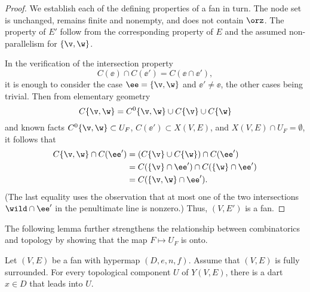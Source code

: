 \begin{proof} We establish each of the defining properties of a fan in
  turn.  The node set is unchanged,  remains finite and nonempty,
  and does not contain $\orz$.  The property  of
  $E'$ follow from the corresponding property of $E$ and the assumed
  non-parallelism for $\{\v,\w\}$.

In the verification of the intersection property
\begin{displaymath}
C(\ee)\cap C(\ee') = C(\ee \cap \ee'),
\end{displaymath}
it is enough to consider the case $\ee = \{\v,\w\}$ and $\ee' \ne
\ee$, the other cases being trivial.  Then from elementary geometry 
\begin{displaymath}
C\{\v,\w\} = C^0\{\v,\w\}\cup C\{\v\}\cup C\{\w\}
\end{displaymath}
and
known facts
$C^0\{\v,\w\}\subset U_F$, $C(\ee')\subset X(V,E)$, and $X(V,E)\cap
U_F=\emptyset$, it follows that
\begin{align*}
C\{\v,\w\} \cap C(\ee')  &= (C\{\v\} \cup C\{\w\}) \cap C(\ee') \\
&= C(\{\v\}\cap \ee') \cap C(\{\w\}\cap \ee')\\
&= C(\{\v,\w\}\cap \ee').
\end{align*}
(The last equality uses the observation that at most one of the two
intersections $\wild\cap\ee'$ in the penultimate line is nonzero.)
Thus, $(V,E')$ is a fan.
\end{proof}

The following lemma further strengthens the relationship between
combinatorics and topology by showing that the map $F\mapsto U_F$
is onto.

\begin{lemma}[]\label{lemma:lead-exists}
Let $(V,E)$ be a fan with hypermap $(D,e,n,f)$. %
Assume that $(V,E)$ is fully surrounded.  For every
topological component $U$ of $Y(V,E)$, there is a dart $x\in D$ that
leads into $U$.
\end{lemma}
%
%
%

